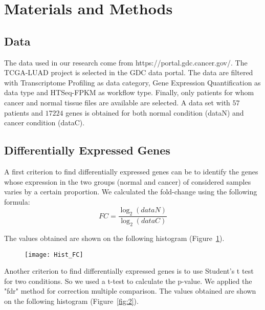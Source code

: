 \documentclass[
10pt, %
a4paper, %
oneside, %
headinclude,footinclude, %
BCOR5mm, %
]{scrartcl}
\begin{document}
\section{Materials and Methods}




\subsection{Data}
The data used in our research come from https://portal.gdc.cancer.gov/. The TCGA-LUAD project is selected in the GDC data portal. The data are filtered with Transcriptome Profiling as data category, Gene Expression Quantification as data type and HTSeq-FPKM as workflow type. Finally, only patients for whom cancer and normal tissue files are available are selected. A data set with $57$ patients and $17224$ genes is obtained for both normal condition (dataN) and cancer condition (dataC).


\subsection{Differentially Expressed Genes}
A first criterion to find differentially expressed genes can be to identify the genes whose expression in the two groups (normal and cancer) of considered samples varies by a certain proportion. We calculated the fold-change using the following formula:
$$
FC = \frac{\log_2{(dataN)}}{\log_2{(dataC)}}
$$

The values obtained are shown on the following histogram (Figure~\ref{fig:1}).

\begin{figure}[h!]
\centering 
\texttt{[image: Hist\_FC]} 
\caption[Histogram of FC]{} %
\label{fig:1} 
\end{figure}
Another criterion to find differentially expressed genes is to use Student’s t test for two conditions.
So we used a t-test to calculate the p-value.
We applied the "fdr" method for correction multiple comparison. 
The values obtained are shown on the following histogram (Figure~\ref{fig:2}).
\end{document}
